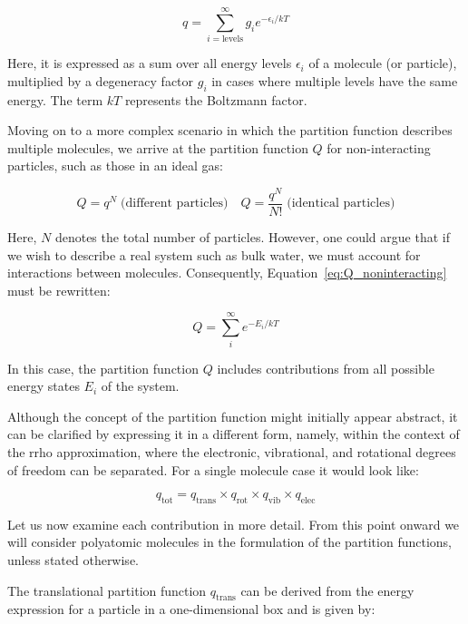 \begin{equation}
    q = \sum_{i = \text{levels}}^{\infty} g_i e^{-\epsilon_i/kT}
\end{equation}

Here, it is expressed as a sum over all energy levels $\epsilon_i$ of a molecule (or particle), multiplied by a degeneracy factor $g_i$ in cases where multiple levels have the same energy. The term $kT$ represents the Boltzmann factor.

Moving on to a more complex scenario in which the partition function describes multiple molecules, we arrive at the partition function $Q$ for non-interacting particles, such as those in an ideal gas:

\begin{equation}
    \label{eq:Q_noninteracting}
    Q = q^N \; \text{(different particles)} \quad Q = \frac{q^N}{N!} \; \text{(identical particles)}
\end{equation}

Here, $N$ denotes the total number of particles. However, one could argue that if we wish to describe a real system such as bulk water, we must account for interactions between molecules. Consequently, Equation~\ref{eq:Q_noninteracting} must be rewritten:

\begin{equation}
    Q = \sum_{i}^{\infty} e^{-E_i/kT}
\end{equation}

In this case, the partition function $Q$ includes contributions from all possible energy states $E_i$ of the system.

Although the concept of the partition function might initially appear abstract, it can be clarified by expressing it in a different form, namely, within the context of the \ac{rrho} approximation, where the electronic, vibrational, and rotational degrees of freedom can be separated. For a single molecule case it would look like:

\begin{equation}
    q_{\text{tot}} = q_{\text{trans}} \times q_{\text{rot}} \times q_{\text{vib}} \times q_{\text{elec}}
\end{equation}

Let us now examine each contribution in more detail. From this point onward we will consider polyatomic molecules in the formulation of the partition functions, unless stated otherwise.

The translational partition function $q_\text{trans}$ can be derived from the energy expression for a particle in a one-dimensional box and is given by:

